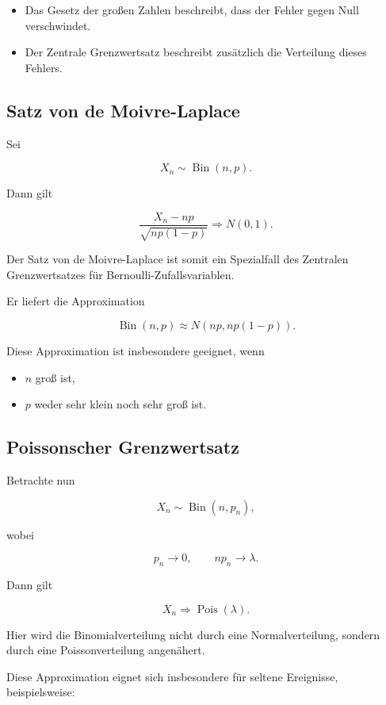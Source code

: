 \begin{itemize}
    \item Das Gesetz der großen Zahlen beschreibt, dass der Fehler gegen Null verschwindet.
    \item Der Zentrale Grenzwertsatz beschreibt zusätzlich die Verteilung dieses Fehlers.
\end{itemize}


\subsection*{Satz von de Moivre-Laplace}

Sei

\[
    X_n\sim\operatorname{Bin}(n,p).
\]

Dann gilt

\[
    \frac{X_n-np}{\sqrt{np(1-p)}}
    \Longrightarrow N(0,1).
\]

Der Satz von de Moivre-Laplace ist somit ein Spezialfall des Zentralen Grenzwertsatzes für Bernoulli-Zufallsvariablen.

Er liefert die Approximation

\[
    \operatorname{Bin}(n,p)
    \approx
    N(np,np(1-p)).
\]

Diese Approximation ist insbesondere geeignet, wenn

\begin{itemize}
    \item $n$ groß ist,
    \item $p$ weder sehr klein noch sehr groß ist.
\end{itemize}

\subsection*{Poissonscher Grenzwertsatz}

Betrachte nun

\[
    X_n\sim\operatorname{Bin}(n,p_n),
\]

wobei

\[
    p_n\longrightarrow 0,
    \qquad
    np_n\longrightarrow\lambda.
\]

Dann gilt

\[
    X_n
    \Longrightarrow
    \operatorname{Pois}(\lambda).
\]

Hier wird die Binomialverteilung nicht durch eine Normalverteilung, sondern durch eine Poissonverteilung angenähert.

Diese Approximation eignet sich insbesondere für seltene Ereignisse, beispielsweise:


